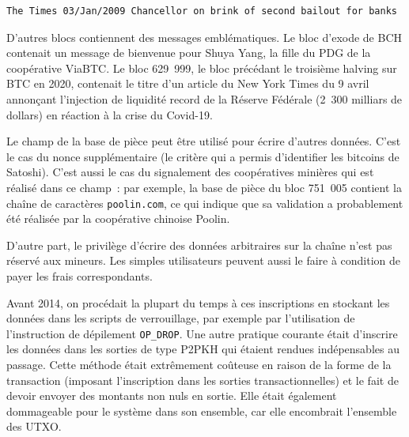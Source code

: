 \begin{Verbatim}[fontsize=\footnotesize]
The Times 03/Jan/2009 Chancellor on brink of second bailout for banks
\end{Verbatim}

D'autres blocs contiennent des messages emblématiques. Le bloc d'exode de BCH contenait un message de bienvenue pour Shuya Yang, la fille du PDG de la coopérative ViaBTC. Le bloc 629~999, le bloc précédant le troisième halving sur BTC en 2020, contenait le titre d'un article du New York Times du 9 avril annonçant l'injection de liquidité record de la Réserve Fédérale (2~300 milliars de dollars) en réaction à la crise du Covid-19.

Le champ de la base de pièce peut être utilisé pour écrire d'autres données. C'est le cas du nonce supplémentaire (le critère qui a permis d'identifier les bitcoins de Satoshi). C'est aussi le cas du signalement des coopératives minières qui est réalisé dans ce champ~: par exemple, la base de pièce du bloc 751~005 contient la chaîne de caractères \texttt{poolin.com}, ce qui indique que sa validation a probablement été réalisée par la coopérative chinoise Poolin.

D'autre part, le privilège d'écrire des données arbitraires sur la chaîne n'est pas réservé aux mineurs. Les simples utilisateurs peuvent aussi le faire à condition de payer les frais correspondants.

Avant 2014, on procédait la plupart du temps à ces inscriptions en stockant les données dans les scripts de verrouillage, par exemple par l'utilisation de l'instruction de dépilement \texttt{OP\_DROP}. Une autre pratique courante était d'inscrire les données dans les sorties de type P2PKH qui étaient rendues indépensables au passage. Cette méthode était extrêmement coûteuse en raison de la forme de la transaction (imposant l'inscription dans les sorties transactionnelles) et le fait de devoir envoyer des montants non nuls en sortie. Elle était également dommageable pour le système dans son ensemble, car elle encombrait l'ensemble des UTXO.


